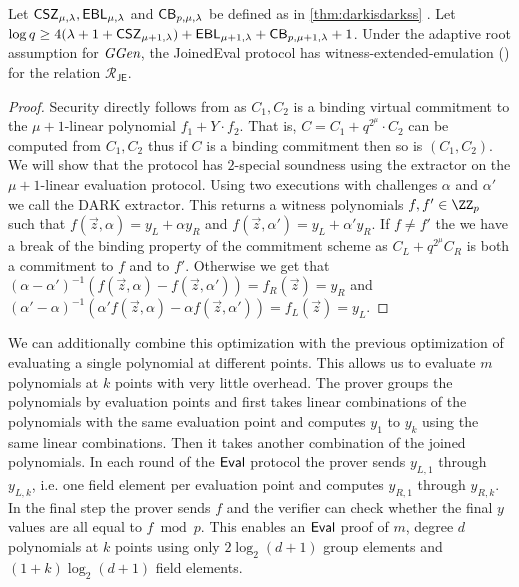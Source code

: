 \newcommand{\theoremjoined}{
	Let $\CSZ,\EBL$ and $\CorrectnessBound$ be defined as in \cref{thm:darkisdarkss} . Let  $\log q \geq 4(\lambda + 1 + \CSZ[\mu+1]) + \EBL[\mu+1] + \CorrectnessBound[\mu+1] + 1$.
Under the adaptive root assumption for $\ggen$, the \textsf{JoinedEval} protocol has witness-extended-emulation (\Cref{def:wee}) for the relation $\mathcal{R_\textsf{JE}}$. }
\begin{theorem}
\label{thm:joined}
\theoremjoined
\end{theorem}
\begin{proof}
	Security directly follows from  as $C_1,C_2$ is a binding virtual commitment to the $\mu+1$-linear polynomial $f_1+ Y \cdot f_2$. That is, $C=C_1+q^{2^\mu} \cdot C_2$ can be computed from $C_1,C_2$ thus if $C$ is a binding commitment then so is $(C_1,C_2)$. We will show that the protocol has $2$-special soundness using the extractor on the $\mu+1$-linear evaluation protocol. Using two executions with challenges $\alpha$ and $\alpha'$ we call the DARK extractor. This returns a witness polynomials $f,f' \in \ZZ_p$ such that $f(\vec{z},\alpha)=y_L+\alpha y_R$ and $f(\vec{z},\alpha')=y_L+\alpha'y_R$. If $f\neq f'$ the we have a break of the binding property of the commitment scheme as $C_L+q^{2^\mu} C_R$ is both a commitment to $f$ and to $f'$. Otherwise we get that $(\alpha-\alpha')^{-1}( f(\vec{z},\alpha)-f(\vec{z},\alpha'))=f_R(\vec{z})=y_R$ and $(\alpha'-\alpha)^{-1}(\alpha' f(\vec{z},\alpha)-\alpha f(\vec{z},\alpha'))=f_L(\vec{z})=y_L$. 
\end{proof}

We can additionally combine this optimization with the previous optimization of evaluating a single polynomial at different points. This allows us to evaluate $m$ polynomials at $k$ points with very little overhead. 
The prover groups the polynomials by evaluation points and first takes linear combinations of the polynomials with the same evaluation point and computes $y_1$ to $y_k$ using the same linear combinations. Then it takes another combination of the joined polynomials. In each round of the $\textsf{{Eval}}$ protocol the prover sends $y_{L,1}$ through $y_{L,k}$, i.e. one field element per evaluation point and computes $y_{R,1}$ through $y_{R,k}$. In the final step the prover sends $f$ and the verifier can check whether the final $y$ values are all equal to $f\bmod p$.
 This enables an $\textsf{{Eval}}$ proof of $m$, degree $d$ polynomials at $k$ points using only $2\log_2(d+1)$ group elements and $(1+k)\log_2(d+1)$ field elements.
 
